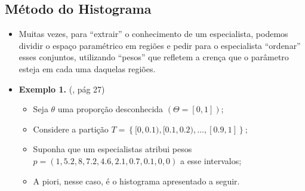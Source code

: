 \documentclass[
]{book}
\newenvironment{Shaded}{\begin{snugshade}}{\end{snugshade}}
\newcommand{\DataTypeTok}[1]{\textcolor[rgb]{0.13,0.29,0.53}{#1}}
\newcommand{\DecValTok}[1]{\textcolor[rgb]{0.00,0.00,0.81}{#1}}
\newcommand{\FloatTok}[1]{\textcolor[rgb]{0.00,0.00,0.81}{#1}}
\newcommand{\KeywordTok}[1]{\textcolor[rgb]{0.13,0.29,0.53}{\textbf{#1}}}
\newcommand{\NormalTok}[1]{#1}
\newcommand{\OperatorTok}[1]{\textcolor[rgb]{0.81,0.36,0.00}{\textbf{#1}}}
\newcommand{\StringTok}[1]{\textcolor[rgb]{0.31,0.60,0.02}{#1}}
\providecommand{\tightlist}{%
  \setlength{\itemsep}{0pt}\setlength{\parskip}{0pt}}
\begin{document}
\hypertarget{muxe9todo-do-histograma}{%
\subsection{Método do Histograma}\label{muxe9todo-do-histograma}}

\begin{itemize}
\item
  Muitas vezes, para ``extrair'' o conhecimento de um especialista, podemos dividir o espaço paramétrico em regiões e pedir para o especialista ``ordenar'' esses conjuntos, utilizando ``pesos'' que refletem a crença que o parâmetro esteja em cada uma daquelas regiões.
\item
  \textbf{Exemplo 1.} (\citet{Albert09}, pág 27)

  \begin{itemize}
  \tightlist
  \item
    Seja \(\theta\) uma proporção desconhecida \((\Theta=[0,1])\);\\
  \item
    Considere a partição \(T = \left\{[0,0.1), [0.1,0.2), \ldots, [0.9,1] \right\}\);
  \item
    Suponha que um especialistas atribui pesos \(p=(1, 5.2, 8, 7.2, 4.6, 2.1, 0.7, 0.1, 0, 0)\) a esse intervalos;\\
  \item
    A piori, nesse caso, é o histograma apresentado a seguir.
  \end{itemize}
\end{itemize}

\begin{Shaded}
\end{Shaded}
\end{document}
